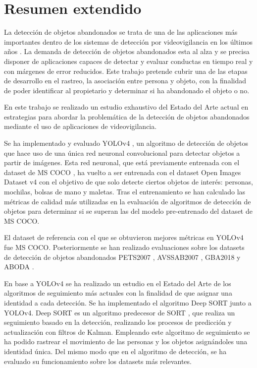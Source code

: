 
\chapter*{Resumen extendido}
\label{cha:resumen-extendido}


La detección de objetos abandonados se trata de una de las aplicaciones más importantes dentro de los sistemas de detección por videovigilancia en los últimos años \cite{DBLP:journals/spm/PlataniotisR05}. La demanda de detección de objetos abandonados esta al alza y se precisa disponer de aplicaciones capaces de detectar y evaluar conductas en tiempo real y con márgenes de error reducidos. Este trabajo pretende cubrir una de las etapas de desarrollo en el rastreo, la asociación entre persona y objeto, con la finalidad de poder identificar al propietario y determinar si ha abandonado el objeto o no.

En este trabajo se realizado un estudio exhaustivo del Estado del Arte actual en estrategias para abordar la problemática de la detección de objetos abandonados mediante el uso de aplicaciones de videovigilancia.

Se ha implementado y evaluado YOLOv4 \cite{bochkovskiy2020yolov4}, un algoritmo de detección de objetos que hace uso de una única red neuronal convolucional para detectar objetos a partir de imágenes. Esta red neuronal, que está previamente entrenada con el dataset de MS COCO \cite{lin2015microsoft}, ha vuelto a ser entrenada con el dataset Open Images Dataset v4 \cite{Kuznetsova_2020} con el objetivo de que solo detecte ciertos objetos de interés: personas, mochilas, bolsas de mano y maletas. Tras el entrenamiento se han calculado las métricas de calidad más utilizadas en la evaluación de algoritmos de detección de objetos para determinar si se superan las del modelo pre-entrenado del dataset de MS COCO.

El dataset de referencia con el que se obtuvieron mejores métricas en YOLOv4 fue MS COCO. Posteriormente se han realizado evaluaciones sobre los datasets de detección de objetos abandonados PETS2007 \cite{pets2007-dataset}, AVSSAB2007 \cite{AVSSAB2007-dataset}, GBA2018 \cite{gba-dataset} y ABODA \cite{aboda-dataset}. 

En base a YOLOv4 se ha realizado un estudio en el Estado del Arte de los algoritmos de seguimiento más actuales con la finalidad de que asignar una identidad a cada detección. Se ha implementado el algoritmo Deep SORT \cite{Wojke2017simple} junto a YOLOv4. Deep SORT  es un algoritmo predecesor de SORT \cite{Bewley_2016}, que realiza un seguimiento basado en la detección, realizando los procesos de predicción y actualización con filtros de Kalman. Empleando este algoritmo de seguimiento se ha podido rastrear el movimiento de las personas y los objetos asignándoles una identidad única. Del mismo modo que en el algoritmo de detección, se ha evaluado su funcionamiento sobre los datasets más relevantes.

